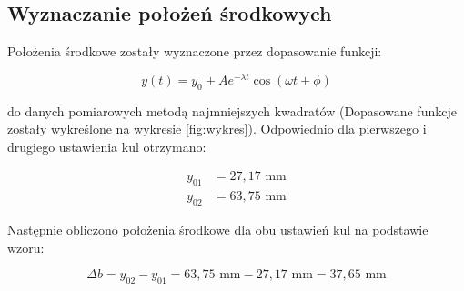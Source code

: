\documentclass[a4paper,12pt]{article}
\begin{document}
\renewcommand{\arraystretch}{1}

\subsection{Wyznaczanie położeń środkowych}

Położenia środkowe zostały wyznaczone przez dopasowanie funkcji:

$$
    y(t) = y_0 + A e^{-\lambda t} \cos(\omega t + \phi)
$$

do danych pomiarowych metodą najmniejszych kwadratów (Dopasowane funkcje zostały wykreślone na wykresie \ref{fig:wykres}). Odpowiednio dla pierwszego i drugiego ustawienia kul otrzymano:

\begin{align*}
    y_{01} & = 27{,}17\text{ mm} \\
    y_{02} & = 63{,}75\text{ mm}
\end{align*}

Następnie obliczono położenia środkowe dla obu ustawień kul na podstawie wzoru:

$$
    \Delta b = y_{02} - y_{01} = 63{,}75\text{ mm} - 27{,}17\text{ mm} = 37{,}65\text{ mm}
$$






\end{document}

